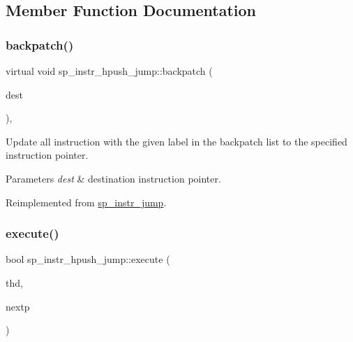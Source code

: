\subsection{Member Function Documentation}
\mbox{\label{classsp__instr__hpush__jump_addad7cbed316eb02d7238e07e092c558}} 
\subsubsection{\texorpdfstring{backpatch()}{backpatch()}}
{\footnotesize\ttfamily virtual void sp\+\_\+instr\+\_\+hpush\+\_\+jump\+::backpatch (\begin{DoxyParamCaption}\item[{uint}]{dest }\end{DoxyParamCaption})\hspace{0.3cm}{\ttfamily [inline]}, {\ttfamily [virtual]}}

Update all instruction with the given label in the backpatch list to the specified instruction pointer.


\begin{DoxyParams}{Parameters}
{\em dest} & destination instruction pointer. \\
\hline
\end{DoxyParams}


Reimplemented from \mbox{\hyperlink{classsp__instr__jump_ad4ac1776111c39aa6d2af89b0ffe0af6}{sp\+\_\+instr\+\_\+jump}}.

\mbox{\label{classsp__instr__hpush__jump_a5ecf945e7fa0e56f22447a64a6fa545e}} 
\subsubsection{\texorpdfstring{execute()}{execute()}}
{\footnotesize\ttfamily bool sp\+\_\+instr\+\_\+hpush\+\_\+jump\+::execute (\begin{DoxyParamCaption}\item[{T\+HD $\ast$}]{thd,  }\item[{uint $\ast$}]{nextp }\end{DoxyParamCaption})\hspace{0.3cm}{\ttfamily [virtual]}}


